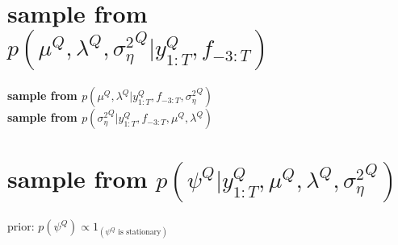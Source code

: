 \section{sample from $p(\mu^Q, \lambda^Q, {\sigma^2_\eta}^Q|y^Q_{1:T}, f_{-3:T})$}

\textbf{sample from $p(\mu^Q, \lambda^Q|y^Q_{1:T}, f_{-3:T}, {\sigma^2_\eta}^Q)$}\\

\noindent \textbf{sample from $p({\sigma^2_\eta}^Q|y^Q_{1:T}, f_{-3:T}, \mu^Q, \lambda^Q)$}\\

\section{sample from $p(\psi^Q|y^Q_{1:T}, \mu^Q, \lambda^Q, {\sigma^2_\eta}^Q)$}

prior: $p(\psi^Q) \propto 1_{(\psi^Q\text{ is stationary})}$